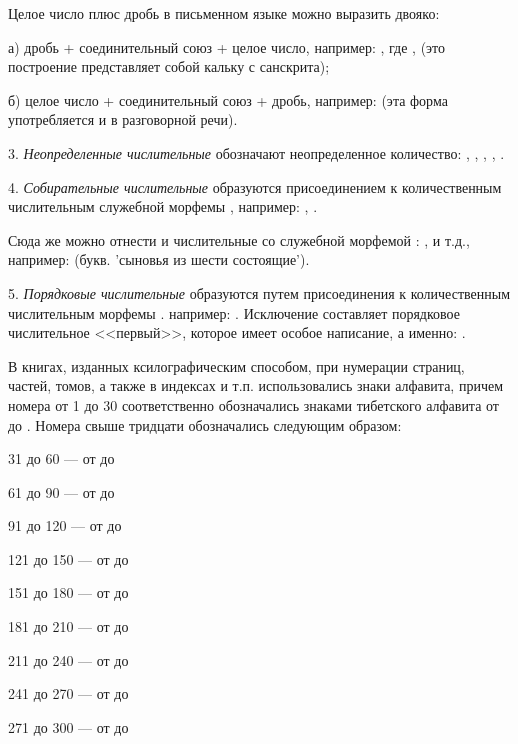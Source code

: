 Целое число плюс дробь в письменном языке можно выразить двояко:
\begin{description}
    \item а) дробь + соединительный союз  + целое число, например:
    , где	,  (это построение представляет собой кальку с санскрита);
    \item б) целое число + соединительный союз + дробь, например:  (эта форма употребляется и в разговорной речи).
\end{description}

3. \emph{Неопределенные числительные} обозначают неопределенное количество:
,
,
,
, .

4. \emph{Собирательные числительные} образуются присоединением к количественным числительным служебной морфемы , например: , .

Сюда же можно отнести и числительные со служебной морфемой :
,
 и т.д., например:
 (букв. 'сыновья из шести состоящие').

5. \emph{Порядковые числительные} образуются путем присоединения к количественным числительным морфемы . например: . Исключение составляет порядковое числительное <<первый>>, которое имеет особое написание, а именно: .

В книгах, изданных ксилографическим способом, при нумерации страниц, частей, томов, а также в индексах и т.п. использовались знаки алфавита, причем номера от 1 до 30 соответственно обозначались знаками тибетского алфавита от  до . Номера свыше тридцати обозначались следующим образом:
\begin{description}
    \item 31 до 60 --- от  до 
    \item 61 до 90 --- от  до 
    \item 91 до 120 --- от  до 
    \item 121 до 150 --- от  до 
    \item 151 до 180 --- от	 до 
    \item 181 до 210 --- от	 до 
    \item 211 до 240 --- от  до 
    \item 241 до 270 --- от  до 
    \item 271 до 300 --- от  до 
\end{description}
